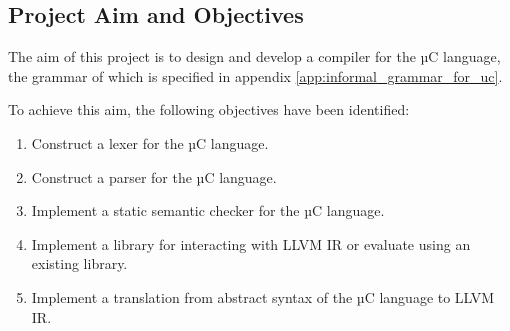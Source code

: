 
\subsection{Project Aim and Objectives}
\label{sec:intro_project_aim_and_objectives}

The aim of this project is to design and develop a compiler for the µC language, the grammar of which is specified in appendix \ref{app:informal_grammar_for_uc}.

To achieve this aim, the following objectives have been identified:

\begin{enumerate}
	\item \label{itm:obj_lexical_analysis} Construct a lexer for the µC language.
	\item \label{itm:obj_syntactic_analysis} Construct a parser for the µC language.
	\item \label{itm:obj_semantic_analysis} Implement a static semantic checker for the µC language.
	\item \label{itm:obj_intermediate_representation} Implement a library for interacting with LLVM IR or evaluate using an existing library.
	\item \label{itm:obj_ir_generation} Implement a translation from abstract syntax of the µC language to LLVM IR.
\end{enumerate}
